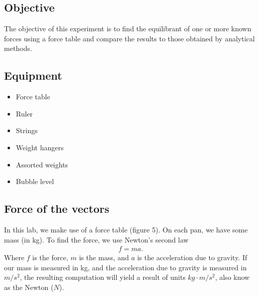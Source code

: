 \documentclass{report}
\begin{document}
    \subsection{Objective}
    \bigbreak \noindent 
    The objective of this experiment is to find the equilibrant of one or more known forces using a force table and compare the results to those obtained by analytical methods.
    \bigbreak \noindent 
    \subsection{Equipment}
    \begin{itemize}
        \item Force table
        \item Ruler
        \item Strings
        \item Weight hangers
        \item Assorted weights
        \item Bubble level
    \end{itemize}
    \bigbreak \noindent 
    \subsection{Force of the vectors}
    \bigbreak \noindent 
    In this lab, we make use of a force table (figure 5). On each pan, we have some mass (in kg). To find the force, we use Newton's second law
    \begin{align*}
        f = ma
    .\end{align*}
    Where $f$ is the force, $m$ is the mass, and $a$ is the acceleration due to gravity. If our mass is measured in kg, and the acceleration due to gravity is measured in $m/s^{2}$, the resulting computation will yield a result of units $kg \cdot m/s^{2}$, also know as the Newton ($N$).
    \pagebreak 
    \bigbreak \noindent 
\end{document}

